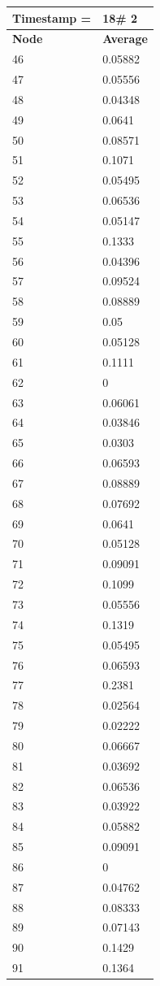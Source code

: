 \begin{tabular}{|l||l|}
\hline
\textbf{Timestamp =} & \textbf{18}\# 2\\\hline
	\textbf{Node} & \textbf{Average} \\ \hline
\hline
	46 & 0.05882 \\ \hline
	47 & 0.05556 \\ \hline
	48 & 0.04348 \\ \hline
	49 & 0.0641 \\ \hline
	50 & 0.08571 \\ \hline
	51 & 0.1071 \\ \hline
	52 & 0.05495 \\ \hline
	53 & 0.06536 \\ \hline
	54 & 0.05147 \\ \hline
	55 & 0.1333 \\ \hline
	56 & 0.04396 \\ \hline
	57 & 0.09524 \\ \hline
	58 & 0.08889 \\ \hline
	59 & 0.05 \\ \hline
	60 & 0.05128 \\ \hline
	61 & 0.1111 \\ \hline
	62 & 0 \\ \hline
	63 & 0.06061 \\ \hline
	64 & 0.03846 \\ \hline
	65 & 0.0303 \\ \hline
	66 & 0.06593 \\ \hline
	67 & 0.08889 \\ \hline
	68 & 0.07692 \\ \hline
	69 & 0.0641 \\ \hline
	70 & 0.05128 \\ \hline
	71 & 0.09091 \\ \hline
	72 & 0.1099 \\ \hline
	73 & 0.05556 \\ \hline
	74 & 0.1319 \\ \hline
	75 & 0.05495 \\ \hline
	76 & 0.06593 \\ \hline
	77 & 0.2381 \\ \hline
	78 & 0.02564 \\ \hline
	79 & 0.02222 \\ \hline
	80 & 0.06667 \\ \hline
	81 & 0.03692 \\ \hline
	82 & 0.06536 \\ \hline
	83 & 0.03922 \\ \hline
	84 & 0.05882 \\ \hline
	85 & 0.09091 \\ \hline
	86 & 0 \\ \hline
	87 & 0.04762 \\ \hline
	88 & 0.08333 \\ \hline
	89 & 0.07143 \\ \hline
	90 & 0.1429 \\ \hline
	91 & 0.1364 \\ \hline
\end{tabular}
